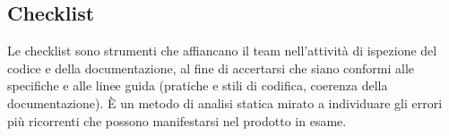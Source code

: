 \subsection{Checklist}

\par Le checklist sono strumenti che affiancano il team nell'attività di ispezione del codice e della documentazione, al fine di accertarsi che siano conformi alle specifiche e alle linee guida (pratiche e stili di codifica, coerenza della documentazione). È un metodo di analisi statica mirato a individuare gli errori più ricorrenti che possono manifestarsi nel prodotto in esame.

\clearpage
